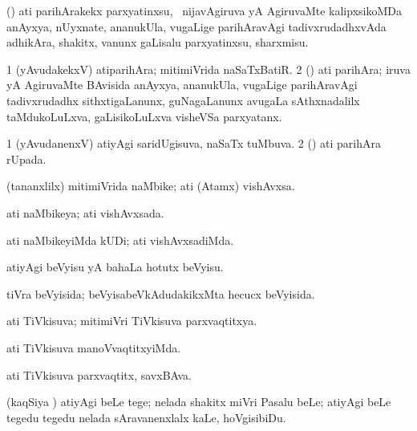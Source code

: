\noindent
\gl{\akirx}
\bmng
(\mashA) ati parihArakekx parxyatinxsu, \kanmu\ nijavAgiruva yA AgiruvaMte kalipxsikoMDa anAyxya, nUyxnate, ananukUla, \mo vugaLige parihAravAgi tadivxrudadhxvAda adhikAra, shakitx, \mo vanunx gaLisalu parxyatinxsu, sharxmisu. 
\emng
\eentry

\bentry
{}
\gl{\nA}
\bmng
\bnum
\num{1} (yAvudakekxV) atiparihAra; mitimiVrida naSaTxBatiR. 
\num{2} (\mashA) ati parihAra; iruva yA AgiruvaMte BAvisida anAyxya, ananukUla, \mo vugaLige parihAravAgi tadivxrudadhx sithxtigaLanunx, guNagaLanunx avugaLa sAthxnadalilx taMdukoLuLxva, gaLisikoLuLxva visheVSa parxyatanx. 
\enum
\emng
\eentry

\bentry
{}
\gl{\gu}
\bmng
\bnum
\num{1} (yAvudanenxV) atiyAgi saridUgisuva, naSaTx tuMbuva. 
\num{2} (\mashA) ati parihAra rUpada. 
\enum
\emng
\eentry

\bentry
{}
\gl{\nA}
\bmng
(tananxlilx) mitimiVrida naMbike; ati (Atamx) vishAvxsa. 
\emng
\eentry

\bentry
{}
\gl{\gu}
\bmng
ati naMbikeya; ati vishAvxsada. 
\emng
\eentry

\bentry
{}
\gl{\kirxvi}
\bmng
ati naMbikeyiMda kUDi; ati vishAvxsadiMda. 
\emng
\eentry

\bentry
{}
\gl{\sakirx}
\bmng
atiyAgi beVyisu yA bahaLa hotutx beVyisu. 
\emng
\eentry

\bentry
{}
\gl{\gu}
\bmng
tiVra beVyisida; beVyisabeVkAdudakikxMta hecucx beVyisida. 
\emng
\eentry

\bentry
{}
\gl{\gu}
\bmng
ati TiVkisuva; mitimiVri TiVkisuva parxvaqtitxya. 
\emng
\eentry

\bentry
{}
\gl{\kirxvi}
\bmng
ati TiVkisuva manoVvaqtitxyiMda. 
\emng
\eentry

\bentry
{}
\gl{\nA}
\bmng
ati TiVkisuva parxvaqtitx, savxBAva. 
\emng
\eentry

\bentry
{}
\gl{\sakirx}
\bmng
(kaqSiya \vi) atiyAgi beLe tege; nelada shakitx miVri Pasalu beLe; atiyAgi beLe tegedu tegedu nelada sAravanenxlalx kaLe, hoVgisibiDu. 
\emng
\eentry

